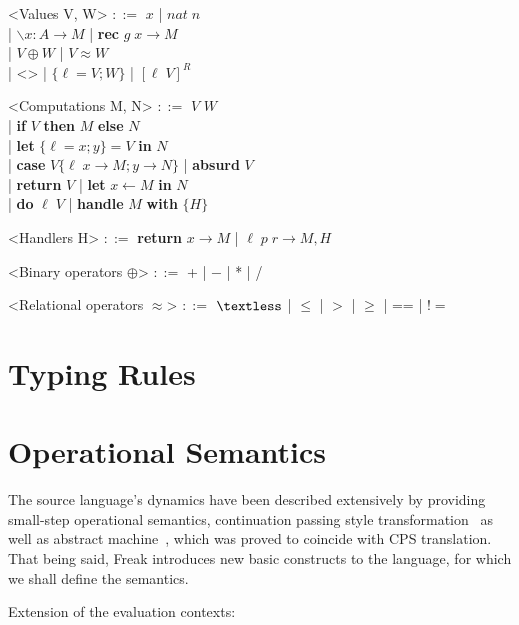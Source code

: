 \documentclass[declaration,shortabstract]{iithesis}
\theoremstyle{definition} \newtheorem{definition}{Definition}[chapter]
\theoremstyle{remark} \newtheorem{remark}[definition]{Observation}
\theoremstyle{plain} \newtheorem{theorem}[definition]{Theorem}
\theoremstyle{plain} \newtheorem{lemma}[definition]{Lemma}
\begin{document}
    \begin{grammar}

        <Values V, W> $::=$ $ x $ | $nat \; n$ \\
            | $ \backslash x : A \rightarrow M $ | \textbf{rec} $ g \; x \rightarrow M $\\
            | $V \oplus W$ | $V \approx W$ \\
            | <> | $ \{ \ell = V; W\} $  | ${[ \ell \; V]}^{R}$

        <Computations M, N> $::=$ $ V $ $ W $ \\
            | \textbf{if} $V$ \textbf{then} $M$ \textbf{else} $N$ \\
            | \textbf{let} $\{\ell  = x; y\} = V$ \textbf{in} $ N $ \\
            | \textbf{case} $V \{ \ell \; x \rightarrow M; y \rightarrow N\}$ | \textbf{absurd} $ V $ \\
            | \textbf{return} $V$ | \textbf{let} $ x \leftarrow M $ \textbf{in} $ N $ \\
            | \textbf{do} $\ell \; V$ | \textbf{handle} $M$ \textbf{with} $ \{ H \} $

        <Handlers H> $::=$ \textbf{return} $ x \rightarrow M $ | $ \ell \; p \; r \rightarrow M, H $

        <Binary operators $\oplus$> $::=$ + | $-$ | * | /

        <Relational operators $\approx$> $::=$ $ \textless $ | $\leqslant$ | $>$ | $\geqslant$ | == | $!= $

    \end{grammar}

\section{Typing Rules}
\section{Operational Semantics}

    The source language's dynamics have been described
    extensively by providing small-step operational semantics,
    continuation passing style transformation~\cite{handlers-cps} as well
    as abstract machine~\cite{liberating-effects}, which was proved to coincide
    with CPS translation. That being said, Freak introduces new basic
    constructs to the language, for which we shall define the semantics.

    \begin{flushleft}
    Extension of the evaluation contexts:
    \end{flushleft}
\end{document}
